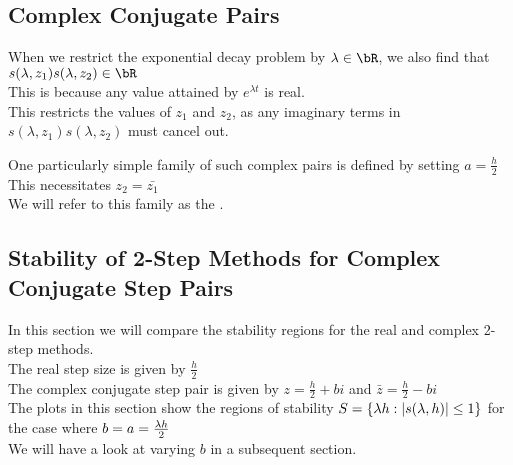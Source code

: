 \subsection{Complex Conjugate Pairs}
\begin{multicols}{2}
\columnbreak{}
\par When we restrict the exponential decay problem by $\lambda \in \bR$, we also find that $s(\lambda, z_1) s(\lambda, z_2) \in \bR$\\
This is because any value attained by $e^{\lambda t}$ is real.\\
This restricts the values of $z_1$ and $z_2$, as any imaginary terms in $s(\lambda, z_1) s(\lambda, z_2)$ must cancel out.\\

\par One particularly simple family of such complex pairs is defined by setting $a = \frac{h}{2}$\\
This necessitates $z_2 = \bar{z_1}$\\
We will refer to this family as the .\\
\end{multicols}

\subsection{Stability of 2-Step Methods for Complex Conjugate Step Pairs}
\par In this section we will compare the stability regions for the real and complex 2-step methods.\\
The real step size is given by $\frac{h}{2}$\\
The complex conjugate step pair is given by $z = \frac{h}{2} + bi$ and $\bar{z} = \frac{h}{2} - bi$\\
The plots in this section show the regions of stability $S = \{\lambda h : |s(\lambda, h)| \leq 1\}$ for the case where $b=a=\frac{\lambda h}{2}$\\
We will have a look at varying $b$ in a subsequent section.\\

